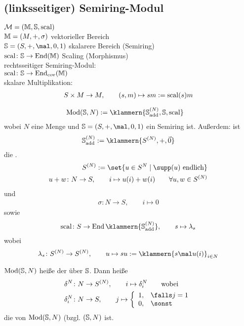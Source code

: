 \subsection{(linksseitiger) Semiring-Modul}
$\mathcal{M}=(\M,\S,\scal)$\\
$\M=(M,+,\sigma)$ vektorieller Bereich\\
$\S=(S,+,\mal,0,1)$ skalarere Bereich (Semiring)\\
$\scal\colon\S\to\End(\M)$ Scaling (Morphismus)\\
rechtsseitiger Semiring-Modul:\\
$\scal\colon\S\to\End_{\cov}(\M)$ \\
skalare Multiplikation:
\begin{align*}
	S\times M\to M,\qquad(s,m)\mapsto s m:=\scal(s)m
\end{align*}

\begin{beispiel}
	\begin{align*}
		\Mod(\S,N)&:=\klammern{\S_{\add}^{(N)},\S,\scal}
	\end{align*}
	wobei $N$ eine Menge und $\S=(S,+,\mal,0,1)$ ein Semiring ist.
	Außerdem: ist
	\begin{align*}
		\S_{\add}^{(N)}:=\klammern{S^{(N)},+,\vec{0}}
	\end{align*}
	die .
	\begin{align*}
		S^{(N)}:=\set{ u\in S^N\mid\supp(u)\text{ endlich}}\\
		u+w\colon N\to S,\qquad i\mapsto u(i)+w(i)\qquad\forall u,w\in S^{(N)}
	\end{align*}
	und
	\begin{align*}
		\sigma\colon N\to S,\qquad i\mapsto 0
	\end{align*}
	sowie
	\begin{align*}
		\scal\colon S\to\End\klammern{\S_{\add}^{(N)}},\qquad s\mapsto \lambda_s
	\end{align*}
	wobei
	\begin{align*}
		\lambda_s\colon S^{(N)}\to S^{(N)},\qquad
		u\mapsto su:=\klammern{s\mal u(i)}_{i\in N}
	\end{align*}
	
	$\Mod(\S,N)$ heiße der  über $\S$.
	Dann heiße
	\begin{align*}
		\delta^N&\colon N\to S^{(N)},\qquad i\mapsto\delta_i^N\qquad\text{wobei}\\
		 \delta_i^N&\colon N\to S,\qquad j\mapsto\left\lbrace\begin{array}{cl}
		 	1, &\falls j=1\\
		 	0, & \sonst
		 \end{array}\right.
	\end{align*}
	die  von $\Mod(\S,N)$ (bzgl. $(\S,N)$ ist.
\end{beispiel}

